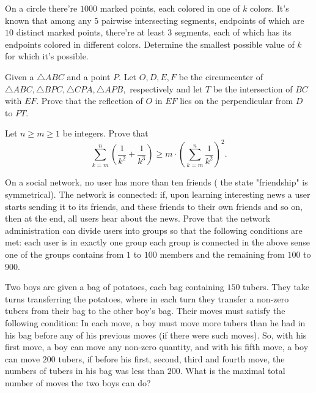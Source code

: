\documentclass[11pt]{scrartcl}
\begin{document}
\begin{problem}[4738483219849723703]
On a circle there're $1000$ marked points, each colored in one of $k$ colors. It's known that among any $5$ pairwise intersecting segments, endpoints of which are $10$ distinct marked points, there're at least $3$ segments, each of which has its endpoints colored in different colors. Determine the smallest possible value of $k$ for which it's possible.
\end{problem}
\begin{problem}[8569243655022492300]
	Given a $ \triangle ABC $ and a point $ P. $ Let $ O, D, E, F $ be the circumcenter of $ \triangle ABC, \triangle BPC, \triangle CPA, \triangle APB, $ respectively and let $ T $ be the intersection of $ BC $ with $ EF. $ Prove that the reflection of $ O $ in $ EF $ lies on the perpendicular from $ D $ to $ PT. $
\end{problem}
\begin{problem}[5968448186928885521]
Let $n\ge m\ge 1$ be integers. Prove that
\[\sum_{k=m}^n \left (\frac 1{k^2}+\frac 1{k^3}\right) \ge m\cdot \left(\sum_{k=m}^n \frac 1{k^2}\right)^2.\]
\end{problem}
\begin{problem}[6029540617185205962]
On a social network, no user has more than ten friends ( the state "friendship" is symmetrical). The network is connected: if, upon learning interesting news a user starts sending it to its friends, and these friends to their own friends and so on, then at the end, all users hear about the news.
Prove that the network administration can divide users into groups so that the following conditions are met:
each user is in exactly one group
each group is connected in the above sense
one of the groups contains from $1$ to $100$ members and the remaining from $100$ to $900$.
\end{problem}
\begin{problem}[326164407850848]
Two boys are given a bag of potatoes, each bag containing $150$ tubers. They take turns transferring the potatoes, where in each turn they transfer a non-zero tubers from their bag to the other boy's bag. Their moves must satisfy the following condition: In each move, a boy must move more tubers than he had in his bag before any of his previous moves (if there were such moves). So, with his first move, a boy can move any non-zero quantity, and with his fifth move, a boy can move $200$ tubers, if before his first, second, third and fourth move, the numbers of tubers in his bag was less than $200$. What is the maximal total number of moves the two boys can do?
\end{problem}
\end{document}
